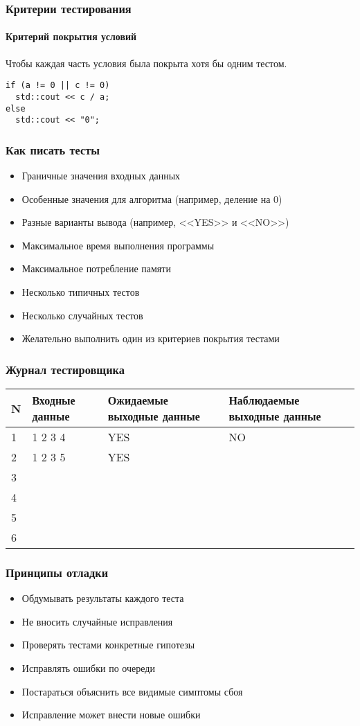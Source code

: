 \documentclass{beamer}
\begin{document}
  \begin{frame}[fragile]
    \frametitle{Критерии тестирования}
    \framesubtitle{Критерий покрытия условий}
    Чтобы каждая часть условия была покрыта хотя бы одним тестом.
\begin{lstlisting}
if (a != 0 || c != 0)
  std::cout << c / a;
else
  std::cout << "0";
\end{lstlisting}
\end{frame}

  \begin{frame}
    \frametitle{Как писать тесты}
    \begin{itemize}[<+->]
    \item Граничные значения входных данных
    \item Особенные значения для алгоритма (например, деление на $0$)
    \item Разные варианты вывода (например, <<YES>> и <<NO>>)
    \item Максимальное время выполнения программы
    \item Максимальное потребление памяти
    \item Несколько типичных тестов
    \item Несколько случайных тестов
    \item Желательно выполнить один из критериев покрытия тестами
    \end{itemize}
  \end{frame}

  \begin{frame}[fragile]
    \frametitle{Журнал тестировщика}
    \begin{tabular}{p{0.6cm}|p{2cm}|p{3cm}|p{3.5cm}}
     \textbf N & Входные данные & Ожидаемые выходные данные & Наблюдаемые выходные данные \\
     \hline 1 & 1 2 3 4 & YES & NO \\
     \hline 2 & 1 2 3 5 & YES & \\
     \hline 3 & & & \\
     \hline 4 & & & \\
     \hline 5 & & & \\
     \hline 6 & & & \\
    \end{tabular}
\end{frame}

\begin{frame}
  \frametitle{Принципы отладки}
  \begin{itemize}[<+->]
    \item Обдумывать результаты каждого теста
    \item Не вносить случайные исправления
    \item Проверять тестами конкретные гипотезы
    \item Исправлять ошибки по очереди
    \item Постараться объяснить все видимые симптомы сбоя
    \item Исправление может внести новые ошибки
  \end{itemize}
\end{frame}
\end{document}
